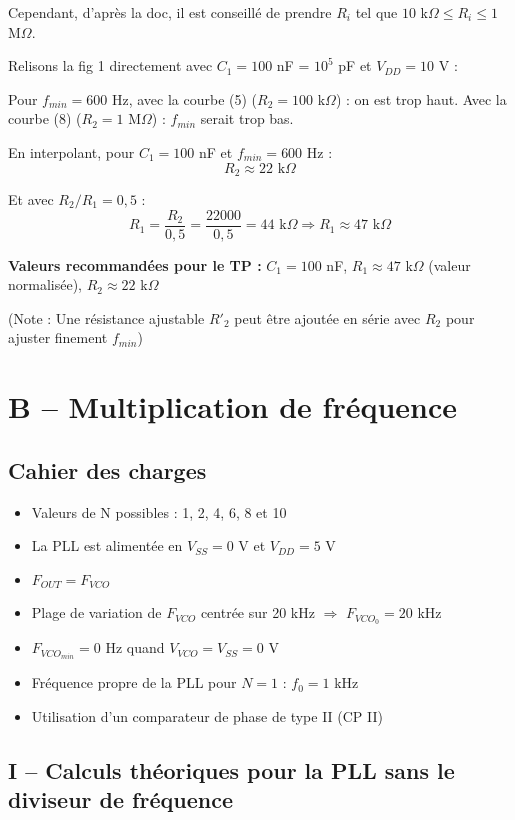 \documentclass[a4paper,11pt]{article}
\begin{document}
Cependant, d'après la doc, il est conseillé de prendre $R_i$ tel que $10$ k$\Omega \leq R_i \leq 1$ M$\Omega$.

Relisons la fig 1 directement avec $C_1 = 100$ nF = $10^5$ pF et $V_{DD} = 10$ V :

Pour $f_{min} = 600$ Hz, avec la courbe (5) ($R_2 = 100$ k$\Omega$) : on est trop haut.
Avec la courbe (8) ($R_2 = 1$ M$\Omega$) : $f_{min}$ serait trop bas.

En interpolant, pour $C_1 = 100$ nF et $f_{min} = 600$ Hz :
\[
\boxed{R_2 \approx 22 \text{ k}\Omega}
\]

Et avec $R_2/R_1 = 0{,}5$ :
\[
R_1 = \frac{R_2}{0{,}5} = \frac{22000}{0{,}5} = 44 \text{ k}\Omega \Rightarrow \boxed{R_1 \approx 47 \text{ k}\Omega}
\]

\textbf{Valeurs recommandées pour le TP :} $C_1 = 100$ nF, $R_1 \approx 47$ k$\Omega$ (valeur normalisée), $R_2 \approx 22$ k$\Omega$

(Note : Une résistance ajustable $R'_2$ peut être ajoutée en série avec $R_2$ pour ajuster finement $f_{min}$)

\newpage
\section*{B -- Multiplication de fréquence}

\subsection*{Cahier des charges}
\begin{itemize}
    \item Valeurs de N possibles : 1, 2, 4, 6, 8 et 10
    \item La PLL est alimentée en $V_{SS} = 0$ V et $V_{DD} = 5$ V
    \item $F_{OUT} = F_{VCO}$
    \item Plage de variation de $F_{VCO}$ centrée sur 20 kHz $\Rightarrow$ $F_{VCO_0} = 20$ kHz
    \item $F_{VCO_{min}} = 0$ Hz quand $V_{VCO} = V_{SS} = 0$ V
    \item Fréquence propre de la PLL pour $N = 1$ : $f_0 = 1$ kHz
    \item Utilisation d'un comparateur de phase de type II (CP II)
\end{itemize}

\subsection*{I -- Calculs théoriques pour la PLL sans le diviseur de fréquence}
\end{document}
